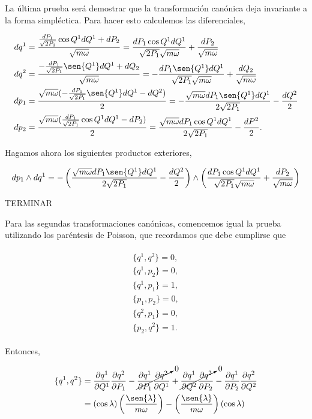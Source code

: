\documentclass[a4paper,10pt]{article}
\numberwithin{equation}{section}
\begin{document}
La última prueba será demostrar que la transformación canónica deja invariante 
a la forma simpléctica. Para hacer esto calculemos las diferenciales, 

\begin{align*}
 dq^1 &= \frac{\frac{dP_1}{\sqrt{2P_1}}\cos{Q^1}dQ^1+dP_2}{\sqrt{m\omega}} = 
 \frac{dP_1\cos{Q^1}dQ^1}{\sqrt{2P_1}\sqrt{m\omega}}+\frac{dP_2}{\sqrt{m\omega}} \\
 dq^2 &=  \frac{-\frac{dP_1}{\sqrt{2P_1}}\sen{Q^1}dQ^1+dQ_2}{\sqrt{m\omega}} = 
 - \frac{dP_1\sen{Q^1}dQ^1}{\sqrt{2P_1}\sqrt{m\omega}}+\frac{dQ_2}{\sqrt{m\omega}} \\
 dp_1 &= \frac{\sqrt{m\omega}(- \frac{dP_1}{\sqrt{2P_1}}\sen{Q^1}dQ^1 - dQ^2)}{2} = 
 - \frac{\sqrt{m\omega}dP_1\sen{Q^1}dQ^1}{2\sqrt{2P_1}} - \frac{dQ^2}{2} \\
 dp_2 &= \frac{\sqrt{m\omega}(\frac{dP_1}{\sqrt{2P_1}}\cos{Q^1}dQ^1 - dP_2)}{2} = 
 \frac{\sqrt{m\omega}dP_1\cos{Q^1}dQ^1}{2\sqrt{2P_1}} - \frac{dP^2}{2}.
\end{align*}

Hagamos ahora los siguientes productos exteriores,

\begin{equation}
 dp_1 \wedge dq^1 = - \left(\frac{\sqrt{m\omega}dP_1\sen{Q^1}dQ^1}{2\sqrt{2P_1}} - \frac{dQ^2}{2}\right) 
 \wedge \left(\frac{dP_1\cos{Q^1}dQ^1}{\sqrt{2P_1}\sqrt{m\omega}}+\frac{dP_2}{\sqrt{m\omega}}\right)
\end{equation}

TERMINAR

\vspace{.3cm}

Para las segundas transformaciones canónicas, comencemos igual la prueba utilizando 
los paréntesis de Poisson, que recordamos que debe cumplirse que 

\begin{align}
 \begin{split}
  \{q^1,q^2\} = 0, \\
  \{q^1,p_2\} = 0, \\
  \{q^1,p_1\} = 1, \\
  \{p_1,p_2\} = 0, \\
  \{q^2,p_1\} = 0, \\
  \{p_2, q^2\} = 1.
 \end{split}
\end{align}

Entonces, 

\begin{align*}
  \{q^1,q^2\} &= \frac{\partial q^1}{\partial Q^1}\frac{\partial q^2}{\partial P_1} - 
 \cancelto{0}{\frac{\partial q^1}{\partial P_1}\frac{\partial q^2}{\partial Q^1}} + 
 \cancelto{0}{\frac{\partial q^1}{\partial Q^2}\frac{\partial q^2}{\partial P_2}} -
 \frac{\partial q^1}{\partial P_2}\frac{\partial q^2}{\partial Q^2} \\
 &= (\cos{\lambda})\left(\frac{\sen{\lambda}}{m\omega}\right) - 
 \left(\frac{\sen{\lambda}}{m\omega}\right)(\cos{\lambda}) 
\end{align*}
\end{document}
